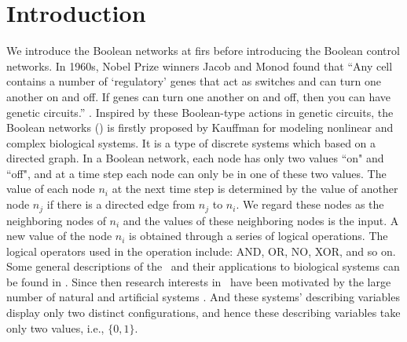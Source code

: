 \section{Introduction}
\label{sec:intro}

We introduce the Boolean networks at firs before introducing the Boolean control networks. In 1960s, Nobel Prize winners Jacob and Monod found that ``Any cell contains a number of `regulatory' genes that act as switches and can turn one another on and off. If genes can turn one another on and off, then you can have genetic circuits.'' \cite{Jacob1961Genetic}. Inspired by these Boolean-type actions in genetic circuits, the Boolean networks (\BNs) is firstly proposed by Kauffman \cite{Kauffman1968Metabolic} for modeling nonlinear and complex biological systems. It is a type of discrete systems which based on a directed graph. In a Boolean network, each node has only two values ``on" and ``off", and at a time step each node can only be in one of these two values. The value of each node $n_i$ at the next time step is determined by the value of another node $n_j$ if there is a directed edge from $n_j$ to $n_i$. We regard these nodes as the neighboring nodes of $n_i$ and the values of these neighboring nodes is the input. A new value of the node $n_i$ is obtained through a series of logical operations. The logical operators used in the operation include: AND, OR, NO, XOR, and so on. Some general descriptions of the \BNs\ and their applications to biological systems can be found in \cite{Kauffman1968Metabolic}. Since then research interests in \BNs\ have been motivated by the large number of natural and artificial systems \cite{Akutsu2000Inferring, Shmulevich2002From, Faur2006Dynamical,Green2007The,Lou2010Multi}. And these systems' describing variables display only two distinct configurations, and hence these describing variables take only two values, i.e., $\{0,1\}$.

